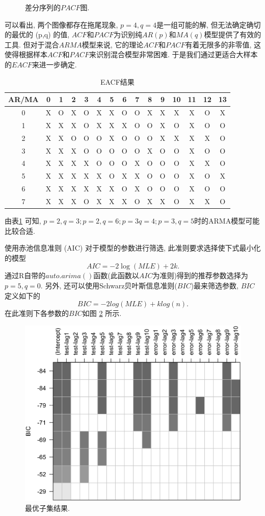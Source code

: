 \documentclass[12pt]{article}
\begin{document}
\begin{center}
\begin{minipage}{0.45\textwidth}
\begin{figure}
            \caption{差分序列的$PACF$图.\label{fig:4}}
        \end{figure}
    \end{minipage}
\end{center}
\qquad 可以看出, 两个图像都存在拖尾现象, $p=4,q=4$是一组可能的解, 但无法确定确切的最优的 (p,q) 的值, $ACF$和$PACF$为识别纯$AR(p)$和$MA(q)$模型提供了有效的工具. 但对于混合$ARMA$模型来说, 它的理论$ACF$和$PACF$有着无限多的非零值, 这使得根据样本$ACF$和$PACF$来识别混合模型非常困难. 于是我们通过更适合大样本的$EACF$来进一步确定.
\begin{longtable}[c]{c|cccccccccccccc}
    \caption{EACF结果}
    \label{tab:my-table}\\
    \hline
    AR/MA & 0 & 1 & 2 & 3 & 4 & 5 & 6 & 7 & 8 & 9 & 10 & 11 & 12 & 13 \\ \hline
    \endfirsthead
    \endhead
    \hline
    \endfoot
    \endlastfoot
    0     & X & O & X & O & X & X & O & O & X & X & X  & X  & O  & X  \\
    1     & X & X & X & O & X & X & X & O & O & X & O  & X  & O  & O  \\
    2     & X & X & O & O & O & X & O & O & O & X & X  & X  & X  & O  \\
    3     & X & X & X & O & O & O & O & O & X & O & O  & X  & O  & O  \\
    4     & X & X & X & X & O & O & O & X & O & O & O  & X  & X  & O  \\
    5     & X & X & X & X & X & O & X & X & O & O & O  & X  & O  & X  \\
    6     & X & X & X & X & X & X & O & X & O & O & O  & X  & O  & O  \\
    7     & X & X & X & O & X & X & X & O & X & X & O  & X  & X  & O  \\ \hline
    \end{longtable}
由表\ref{tab:my-table} 可知, $p=2,q=3;p=2,q=6;p=3 q=4;p=3,q=5$时的ARMA模型可能比较合适. 

\qquad 使用赤池信息准则 (AIC) 对于模型的参数进行筛选, 此准则要求选择使下式最小化的模型\[
    AIC=-2\log(MLE) +2k.
\]
通过R自带的$auto.arima()$函数(此函数以$AIC$为准则)得到的推荐参数选择为$p=5,q=0$. 另外, 还可以使用Schwarz贝叶斯信息准则($BIC$)最来筛选参数, $BIC$定义如下的\[
    BIC= -2log(MLE)+klog(n).
\]
在此准则下各参数的$BIC$如图 \ref{fig:bic} 所示.
\begin{figure}
    \centering
    \includegraphics[width=.5\textwidth]{bic}
    \caption{最优子集结果. \label{fig:bic}}
\end{figure}
\end{document}
